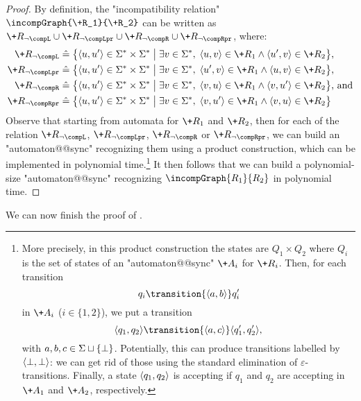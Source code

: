 \begin{proof}
    By definition, the "incompatibility relation" $\incompGraph{\+R_1}{\+R_2}$ can be written as
    $\+R_{\neg\compL} \cup \+R_{\neg\compLpr} \cup \+R_{\neg\compR} \cup \+R_{\neg\compRpr}$, where:
    \begin{align*}
        \+R_{\neg\compL} &\defeq \big\{ \tup{u,u'} \in \Sigma^* \times \Sigma^* \;\big\vert\; \exists v \in \Sigma^*,\; \tup{u,v} \in \+R_1 \land \tup{u',v} \in \+R_2 \big\} \text{,}\\
        \+R_{\neg\compLpr} &\defeq \big\{ \tup{u,u'} \in \Sigma^* \times \Sigma^* \;\big\vert\; \exists v \in \Sigma^*,\; \tup{u',v} \in \+R_1 \land \tup{u,v} \in \+R_2 \big\} \text{,}\\
        \+R_{\neg\compR} &\defeq \big\{ \tup{u,u'} \in \Sigma^* \times \Sigma^* \;\big\vert\; \exists v \in \Sigma^*,\; \tup{v,u} \in \+R_1 \land \tup{v,u'} \in \+R_2 \big\} \text{, and}\\
        \+R_{\neg\compRpr} &\defeq \big\{ \tup{u,u'} \in \Sigma^* \times \Sigma^* \;\big\vert\; \exists v \in \Sigma^*,\; \tup{v,u'} \in \+R_1 \land \tup{v,u} \in \+R_2 \big\}
    \end{align*}
    Observe that starting from automata for $\+R_1$ and $\+R_2$, then for each
    of the relation $\+R_{\neg\compL}$, $\+R_{\neg\compLpr}$, $\+R_{\neg\compR}$ or $\+R_{\neg\compRpr}$, we can build an "automaton@@sync" recognizing them
    using a product construction, which can be implemented in polynomial time.\footnote{More precisely, in this product construction the states are $Q_1 \times Q_2$
    where $Q_i$ is the set of states of an "automaton@@sync" $\+A_i$ for $\+R_i$. Then,
    for each transition
    \[
        q_i \transition{\tup{a,b}} q'_i
    \]
    in $\+A_i$
    ($i \in \{1,2\}$), we put a transition
    \[
        \tup{q_1,q_2} \transition{\tup{a,c}} \tup{q'_1,q'_2},
    \]
    with $a,b,c \in \Sigma\sqcup\{\bot\}$. Potentially, this
    can produce transitions labelled by $\langle\bot,\bot\rangle$: we can get rid of those
    using the standard elimination of $\varepsilon$-transitions.
    Finally, a state $\langle q_1,q_2\rangle$ is accepting if $q_1$ and $q_2$ are accepting
    in $\+A_1$ and $\+A_2$, respectively.}
    It then follows that we can build a polynomial-size "automaton@@sync" recognizing
    $\incompGraph{R_1}{R_2}$ in polynomial time.
\end{proof}

We can now finish the proof of .

